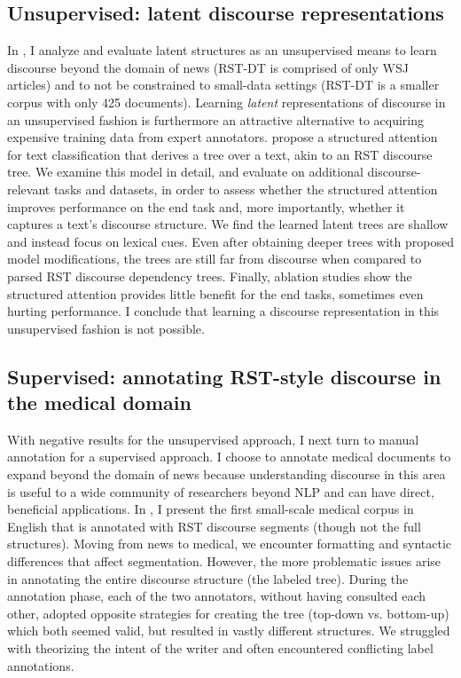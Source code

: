 \subsection{Unsupervised: latent discourse representations} 
In , I analyze and evaluate latent structures as an unsupervised means to learn discourse beyond the domain of news (RST-DT is comprised of only WSJ articles) and to not be constrained to small-data settings (RST-DT is a smaller corpus with only 425 documents).  Learning \emph{latent} representations of discourse in an unsupervised fashion is furthermore an attractive alternative to acquiring expensive training data from expert annotators. \citet{Liu:2018} propose a structured attention for text classification that derives a tree over a text, akin to an RST discourse tree. We examine this model in detail, and evaluate on additional discourse-relevant tasks and datasets, in order to assess whether the structured attention improves performance on the end task and, more importantly, whether it captures a text's discourse structure. We find the learned latent trees are shallow and instead focus on lexical cues. Even after obtaining deeper trees with proposed model modifications, the trees are still far from discourse when compared to parsed RST discourse dependency trees. Finally, ablation studies show the structured attention provides little benefit for the end tasks, sometimes even hurting performance. I conclude that learning a discourse representation in this unsupervised fashion is not possible.

\subsection{Supervised: annotating RST-style discourse in the medical domain} With negative results for the unsupervised approach, I next turn to manual annotation for a supervised approach. I choose to annotate medical documents to expand beyond the domain of news because understanding discourse in this area is useful to a wide community of researchers beyond NLP and can have direct, beneficial applications. In , I present the first small-scale medical corpus in English that is annotated with RST discourse segments (though not the full structures). Moving from news to medical, we encounter formatting and syntactic differences that affect segmentation. However, the more problematic issues arise in annotating the entire discourse structure (the labeled tree). During the annotation phase, each of the two annotators, without having consulted each other, adopted opposite strategies for creating the tree (top-down vs. bottom-up) which both seemed valid, but resulted in vastly different structures. We struggled with theorizing the intent of the writer and often encountered conflicting label annotations. 

